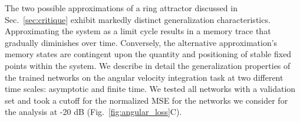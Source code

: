 \documentclass{article} %
\newcounter{ct}
\theoremstyle{definition}
\theoremstyle{remark}
\begin{document}

The two possible approximations of a ring attractor discussed in Sec.~\ref{sec:critique} exhibit markedly distinct generalization characteristics.
Approximating the system as a limit cycle results in a memory trace that gradually diminishes over time.
Conversely, the alternative approximation's memory states are contingent upon the quantity and positioning of stable fixed points within the system.
We describe in detail the generalization properties of the trained networks on the angular velocity integration task at two different time scales:  asymptotic and finite time.
We tested all networks with a validation set and took a cutoff for the normalized MSE for the networks we consider for the analysis at -20 dB (Fig.~\ref{fig:angular_loss}C).
\end{document}

